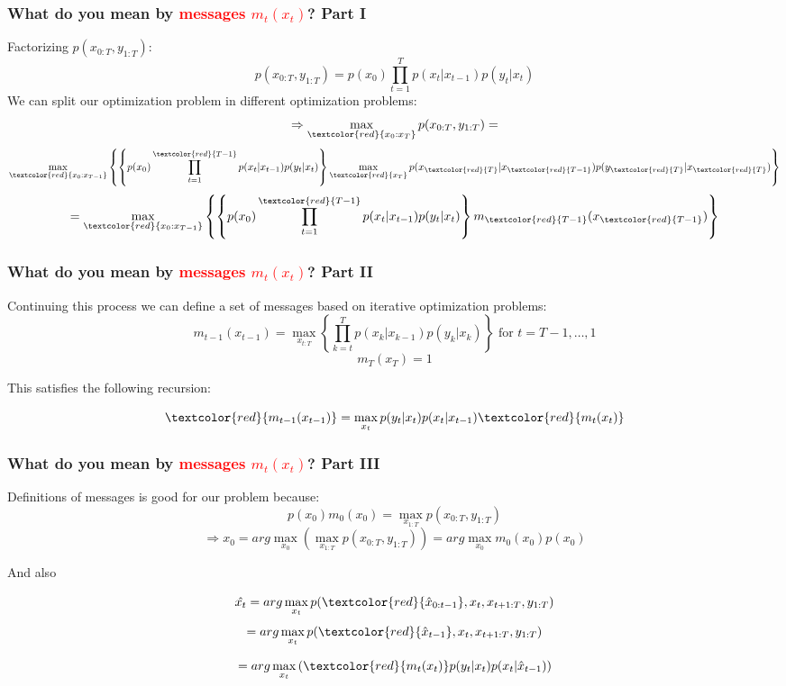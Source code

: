 \documentclass[xcolor=dvipsnames, compress]{beamer}
\begin{document}
\begin{frame}
\frametitle{What do you mean by \textcolor{red}{messages $m_t(x_t)$}? Part I}

Factorizing $p(x_{0:T},y_{1:T})$:
$$p(x_{0:T},y_{1:T}) = p(x_0)\prod_{t=1}^T p(x_{t}|x_{t-1}) p(y_{t}|x_{t})$$
We can split our optimization problem in different optimization problems:
$$\Rightarrow \max_{ \textcolor{red}{ x_0:x_T} } p(x_{0:T},y_{1:T}) =$$ 
$$ \max_{ \textcolor{red}{ x_0:x_{T-1}} } \left\{ \left\{ p(x_0)  \prod_{t=1}^{\textcolor{red}{T-1}} p(x_{t}|x_{t-1}) p(y_{t}|x_{t}) \right\} \max_{ \textcolor{red}{ x_{T}} } p(x_{\textcolor{red}{T}}|x_{\textcolor{red}{T-1}}) p(y_{\textcolor{red}{T}}|x_{\textcolor{red}{T}})  \right \}$$
$$=\max_{ \textcolor{red}{ x_0:x_{T-1}} } \left\{ \left\{ p(x_0)  \prod_{t=1}^{\textcolor{red}{T-1}} p(x_{t}|x_{t-1}) p(y_{t}|x_{t}) \right\} m_{\textcolor{red}{T-1}}(x_{\textcolor{red}{T-1}})  \right \}$$

\end{frame}

\begin{frame}
\frametitle{What do you mean by \textcolor{red}{messages $m_t(x_t)$}? Part II}

Continuing this process we can define a set of messages based on iterative optimization problems:
$$m_{t-1}(x_{t-1}) = \max_{  x_{t:T} }\left\{    \prod_{k=t}^{T} p(x_{k}|x_{k-1}) p(y_{k}|x_{k}) \right\} \mbox{ for } t=T-1, \ldots, 1$$
$$m_T(x_T)=1$$

\vspace{0.3cm}

This satisfies the following recursion:

$$ \textcolor{red}{m_{t-1}(x_{t-1})}  = \max_{  x_{t} } p(y_t | x_t) p(x_t | x_{t-1}) \textcolor{red}{m_t(x_t)}$$

\end{frame}

\begin{frame}
\frametitle{What do you mean by \textcolor{red}{messages $m_t(x_t)$}? Part III}
Definitions of messages is good for our problem because:
$$p(x_0) m_0(x_0) = \max_{x_{1:T}} p(x_{0:T}, y_{1:T})$$
$$\Rightarrow \hat{x_0} = arg \max_{x_0} \left(\max_{x_{1:T}} p(x_{0:T}, y_{1:T}) \right) = arg \max_{x_0} m_0(x_0) p(x_0) $$

And also

$$ \hat{x_t} = arg \max_{x_t} p( \textcolor{red}{ \hat{x}_{0:t-1}}, x_t, x_{t+1:T},y_{1:T} )$$
$$ = arg \max_{x_t} p(\textcolor{red}{\hat{x}_{t-1}}, x_t, x_{t+1:T},y_{1:T} )$$

$$ = arg \max_{x_t} \left(\textcolor{red}{m_t(x_{t})} p(y_t|x_t)  p(x_t | \hat{x}_{t-1})\right) $$

\end{frame}
\end{document}
